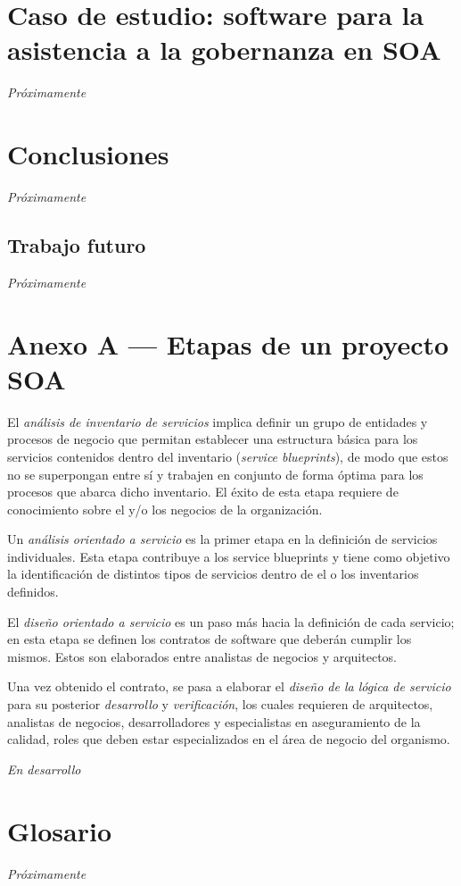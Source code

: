 \documentclass[11pt]{article}
\begin{document}
	\section{Caso de estudio: software para la asistencia a la gobernanza en SOA}
		\label{sec:caso_estudio}
		\emph{Próximamente}

	\section{Conclusiones}
		\label{sec:conclusiones}
		\emph{Próximamente}
		\subsection{Trabajo futuro}
			\emph{Próximamente}

	\section{Anexo A — Etapas de un proyecto SOA}
		\label{sec:anexoA}
		El \emph{análisis de inventario de servicios} implica definir un grupo de entidades y procesos de negocio que permitan establecer una estructura básica para los servicios contenidos dentro del inventario (\emph{service blueprints}), de modo que estos no se superpongan entre sí y trabajen en conjunto de forma óptima para los procesos que abarca dicho inventario. El éxito de esta etapa requiere de conocimiento sobre el y/o los negocios de la organización.

		Un \emph{análisis orientado a servicio} es la primer etapa en la definición de servicios individuales. Esta etapa contribuye a los service blueprints y tiene como objetivo la identificación de distintos tipos de servicios dentro de el o los inventarios definidos.

		El \emph{diseño orientado a servicio} es un paso más hacia la definición de cada servicio; en esta etapa se definen los contratos de software que deberán cumplir los mismos. Estos son elaborados entre analistas de negocios y arquitectos.

		Una vez obtenido el contrato, se pasa a elaborar el \emph{diseño de la lógica de servicio} para su posterior \emph{desarrollo} y \emph{verificación}, los cuales requieren de arquitectos, analistas de negocios, desarrolladores y especialistas en aseguramiento de la calidad, roles que deben estar especializados en el área de negocio del organismo.

		\emph{En desarrollo}

	\section{Glosario}
		\emph{Próximamente}

	
	
\end{document}

